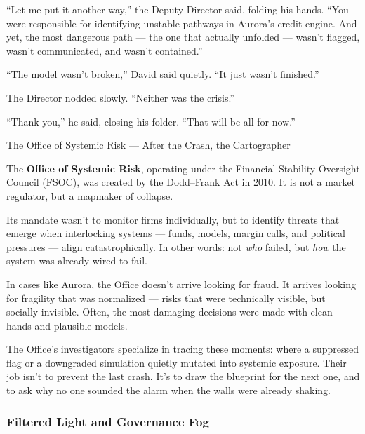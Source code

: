 ``Let me put it another way,'' the Deputy Director said, folding his hands. ``You were responsible for identifying 
unstable pathways in Aurora’s credit engine. And yet, the most dangerous path — the one that actually unfolded 
— wasn’t flagged, wasn’t communicated, and wasn’t contained.''

``The model wasn’t broken,'' David said quietly. ``It just wasn’t finished.''

The Director nodded slowly. ``Neither was the crisis.''

``Thank you,'' he said, closing his folder. ``That will be all for now.''

\medskip

\begin{HistoricalSidebar}{The Office of Systemic Risk --- After the Crash, the Cartographer}

  The \textbf{Office of Systemic Risk}, operating under the Financial Stability Oversight Council (FSOC), 
  was created by the Dodd–Frank Act in 2010. It is not a market regulator, but a mapmaker of collapse.

  \medskip
  
  Its mandate wasn’t to monitor firms individually, but to identify threats that emerge when interlocking 
  systems --- funds, models, margin calls, and political pressures --- align catastrophically. In other words: 
  not \textit{who} failed, but \textit{how} the system was already wired to fail.

  \medskip
  
  In cases like Aurora, the Office doesn’t arrive looking for fraud. It arrives looking for fragility that 
  was normalized — risks that were technically visible, but socially invisible. Often, the most damaging 
  decisions were made with clean hands and plausible models.

  \medskip
  
  The Office’s investigators specialize in tracing these moments: where a suppressed flag or a downgraded 
  simulation quietly mutated into systemic exposure. Their job isn’t to prevent the last crash. It’s to 
  draw the blueprint for the next one, and to ask why no one sounded the alarm when the walls were 
  already shaking.
  
\end{HistoricalSidebar}

\medskip

\subsubsection{Filtered Light and Governance Fog}

